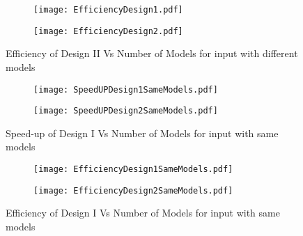 \begin{figure}
\centering
\captionsetup[subfigure]{labelformat=empty}
\begin{subfigure}
\centering
\texttt{[image: EfficiencyDesign1.pdf]}
\label{fig:EfficiencyDesign1}
\end{subfigure}
\begin{subfigure}
\centering
\texttt{[image: EfficiencyDesign2.pdf]}
\label{fig:EfficiencyDesign2}
\end{subfigure}
\label{fig:EfficiencyForDesigns}
\caption{Efficiency of Design II Vs Number of Models for input with different models}
\end{figure}


\begin{figure}
\centering
\captionsetup[subfigure]{labelformat=empty}
\begin{subfigure}
\centering
\texttt{[image: SpeedUPDesign1SameModels.pdf]}
\label{fig:SpeedUPDesign1SameModels}
\end{subfigure}
\begin{subfigure}
\centering
\texttt{[image: SpeedUPDesign2SameModels.pdf]}
\label{fig:SpeedUPDesign2SameModels}
\end{subfigure}
\label{fig:SpeedUPForDesignsSameModels}
\caption{Speed-up of Design I Vs Number of Models for input with same models}
\end{figure}


\begin{figure}
\centering
\captionsetup[subfigure]{labelformat=empty}
\begin{subfigure}
\centering
\texttt{[image: EfficiencyDesign1SameModels.pdf]}
\label{fig:EfficiencyDesign1SameModels}
\end{subfigure}
\begin{subfigure}
\centering
\texttt{[image: EfficiencyDesign2SameModels.pdf]}
\label{fig:EfficiencyDesign2SameModels}
\end{subfigure}
\label{fig:EfficiencyForDesignsSameModels}
\caption{Efficiency of Design I Vs Number of Models for input with same models}
\end{figure}


  